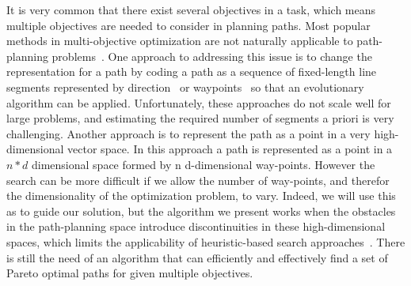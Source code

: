 \documentclass[phd]{byuprop}
\begin{document}
It is very common that there exist several objectives in a task, which means multiple objectives are needed to consider in planning paths.
Most popular methods in multi-objective optimization are not naturally applicable to path-planning problems~\cite{Zhang2007,Deb2014}.
One approach to addressing this issue is to change the representation for a path by coding a path as a sequence of fixed-length line segments represented by direction~\cite{Ahmed2013,Howlett2006} or waypoints~\cite{Sujit2009,Pires2004} so that an evolutionary algorithm can be applied. 
Unfortunately, these approaches do not scale well for large problems, and estimating the required number of segments a priori is very challenging. 
Another approach is to represent the path as a point in a very high-dimensional vector space.
In this approach a path is represented as a point in a $ n * d $ dimensional space formed by n d-dimensional way-points.
However the search can be more difficult if we allow the number of way-points, and therefor the dimensionality of the optimization problem, to vary. 
Indeed, we will use this as to guide our solution, but the algorithm we present works when the obstacles in the path-planning space introduce discontinuities in these high-dimensional spaces, which limits the applicability of heuristic-based search approaches~\cite{Sujit2009,Zhang2007}.
There is still the need of an algorithm that can efficiently and effectively find a set of Pareto optimal paths for given multiple objectives.

\end{document}
